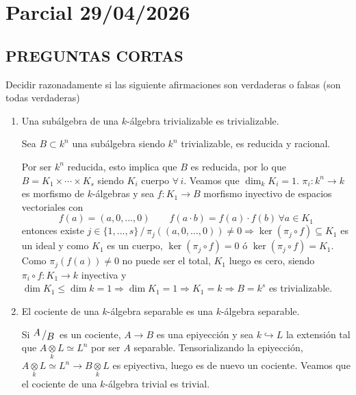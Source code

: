 \section{Parcial 29/04/2026}
\subsection*{PREGUNTAS CORTAS} \justifying
Decidir razonadamente si las siguiente afirmaciones son verdaderas o falsas (son todas verdaderas)
\begin{enumerate}
    \item Una sub\'algebra de una $k$-\'algebra trivializable es trivializable.
    \begin{dem}
        Sea $B \subset k^n$ una sub\'algebra siendo $k^n$ trivializable, es reducida y racional. 

        Por ser $k^n$ reducida, esto implica que $B$ es reducida, por lo que $B=K_1 \times \cdots \times K_s$ siendo $K_i$ cuerpo $\forall \, i$. Veamos que $\dim_k K_i=1$. $\pi_i : k^n \longrightarrow k$ es morfismo de $k$-\'algebras y sea $f:K_1 \longrightarrow B$ morfismo inyectivo de espacios vectoriales con 
        $$f(a) = (a,0,\ldots, 0) \qquad f(a\cdot b) = f(a) \cdot f(b) \, \forall a\in K_1$$
        entonces existe $j \in \{1, \ldots, s\}\, / \, \pi_j((a,0,\ldots, 0)) \neq 0 \Rightarrow \ker(\pi_j \circ f) \subseteq K_1$ es un ideal y como $K_1$ es un cuerpo, $\ker(\pi_j \circ f) = 0$ \'o $\ker(\pi_j \circ f) = K_1$. 
        Como $\pi_j(f(a))\neq 0$ no puede ser el total, $K_1$ luego es cero, siendo $\pi_i \circ f: K_1\longrightarrow k$ inyectiva y $\dim K_1 \le \dim k =1 \Rightarrow \dim K_1 =1 \Rightarrow K_1= k \Rightarrow B = k^s$ es trivializable.
    \end{dem}
    \item El cociente de una $k$-\'algebra separable es una $k$-\'algebra separable.
    \begin{dem}
        Si $\modulo{A}{B}$ es un cociente, $A \longrightarrow B$ es una epiyecci\'on y sea $k \hookrightarrow L$ la extensi\'on tal que $A\underset{k}{\otimes} L \simeq L^n$ por ser $A$ separable. Tensorializando la epiyecci\'on, $A\underset{k}{\otimes} L \simeq L^n \longrightarrow B\underset{k}{\otimes} L$ es epiyectiva, luego es de nuevo un cociente. Veamos que el cociente de una $k$-\'algebra trivial es trivial.
        

\end{dem}
\end{enumerate}
